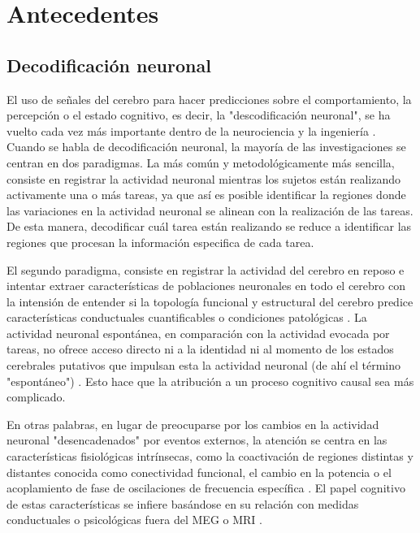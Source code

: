 \documentclass[11pt,letterpaper]{article}
\numberwithin{equation}{subsection}
\numberwithin{table}{subsection}
\begin{document}
\section{Antecedentes}
\subsection{Decodificación neuronal}

\smallskip
\noindent El uso de señales del cerebro para hacer predicciones sobre el comportamiento, la percepción o el estado cognitivo, es decir, la "descodificación neuronal", se ha vuelto cada vez más importante dentro de la neurociencia y la ingeniería \cite{ivezey2021deep}. Cuando se habla de decodificación neuronal, la mayoría de las investigaciones se centran en dos paradigmas. La más común y metodológicamente más sencilla, consiste en registrar la actividad neuronal mientras los sujetos están realizando activamente una o más tareas, ya que así es posible identificar la regiones donde las variaciones en la actividad neuronal se alinean con la realización de las tareas. De esta manera, decodificar cuál tarea están realizando se reduce a identificar las regiones que procesan la información especifica de cada tarea.

\bigskip
\noindent El segundo paradigma, consiste en registrar la actividad del cerebro en reposo e intentar extraer características de poblaciones neuronales en todo el cerebro con la intensión de entender si la topología funcional y estructural del cerebro predice características conductuales cuantificables o condiciones patológicas \cite{van2015opportunities}. La actividad neuronal espontánea, en comparación con la actividad evocada por tareas, no ofrece acceso directo ni a la identidad ni al momento de los estados cerebrales putativos que impulsan esta la actividad neuronal (de ahí el término "espontáneo") \cite{liu2022decoding}. Esto hace que la atribución a un proceso cognitivo causal sea más complicado. 

\bigskip
\noindent En otras palabras, en lugar de preocuparse por los cambios en la actividad neuronal "desencadenados" por eventos externos, la atención se centra en las características fisiológicas intrínsecas, como la coactivación de regiones distintas y distantes conocida como conectividad funcional, el cambio en la potencia o el acoplamiento de fase de oscilaciones de frecuencia específica \cite{becker2018alpha}. El papel cognitivo de estas características se infiere basándose en su relación con medidas conductuales o psicológicas fuera del MEG o MRI \cite{allaman2020spontaneous}. 
\end{document}
